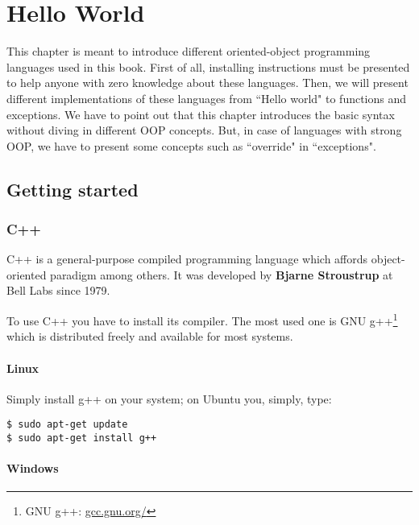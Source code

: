 \documentclass{KodeBook}
\begin{document}
	\chapter{Hello World}
\fi


\begin{introduction}
	This chapter is meant to introduce different oriented-object programming languages used in this book. 
	First of all, installing instructions must be presented to help anyone with zero knowledge about these languages. 
	Then, we will present different implementations of these languages from ``Hello world" to functions and exceptions. 
	We have to point out that this chapter introduces the basic syntax without diving in different OOP concepts.
	But, in case of languages with strong OOP, we have to present some concepts such as ``override" in ``exceptions".
\end{introduction}


\section{Getting started}

\subsection{C++}

C++ is a general-purpose compiled programming language which affords object-oriented paradigm among others. 
It was developed by \textbf{Bjarne Stroustrup} at Bell Labs since 1979.

To use C++ you have to install its compiler. 
The most used one is GNU g++\footnote{GNU g++: \url{gcc.gnu.org/}} which is distributed freely and available for most systems.

\subsubsection{Linux}
Simply install g++ on your system; on Ubuntu you, simply, type:
\begin{lstlisting}[style=shellStyle]
$ sudo apt-get update
$ sudo apt-get install g++
\end{lstlisting}

\subsubsection{Windows}
\end{document}
